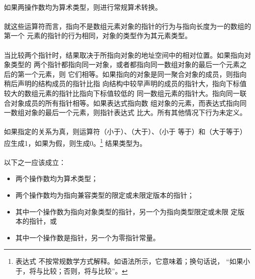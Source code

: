 \semantic
\paragraph{}
如果两操作数均为算术类型，则进行常规算术转换。

\paragraph{}
就这些运算符而言，指向不是数组元素对象的指针的行为与指向长度为一的数组的第一个
元素的指针的行为相同，对象的类型作为其元素类型。

\paragraph{}
当比较两个指针时，结果取决于所指向对象的地址空间中的相对位置。如果指向对象类型的
两个指针都指向同一对象，或者都指向同一数组对象的最后一个元素之后的第一个元素，则
它们相等。如果指向的对象是同一聚合对象的成员，则指向稍后声明的结构成员的指针比指
向结构中较早声明的成员的指针大，指向下标值较大的数组元素的指针比指向下标值较低的
同一数组元素的指针大。指向同一联合对象成员的所有指针相等。如果表达式指向数
组对象的元素，而表达式指向同一数组对象的最后一个元素，则指针表达式
比大。所有其他情况下行为未定义。

\paragraph{}
如果指定的关系为真，则运算符\tm{\tl}（小于）、\tm{\tg}（大于）、\tm{\tl=}（小于
等于）和\tm{\tg=}（大于等于）应生成1，如果为假，则生成0。\footnote{表达式
不按常规数学方式解释。如语法所示，它意味着；换句话说，
``如果小于，将与比较；否则，将与比较''。}
结果类型为。

\syntax
\paragraph{}

\constraint
\paragraph{}
以下之一应该成立：
\begin{itemize}
  \item{两个操作数均为算术类型；}
  \item{两个操作数均为指向兼容类型的限定或未限定版本的指针；}
  \item{其中一个操作数为指向对象类型的指针，另一个为指向类型限定或未限
    定版本的指针，或}
  \item{其中一个操作数是指针，另一个为零指针常量。}
\end{itemize}

